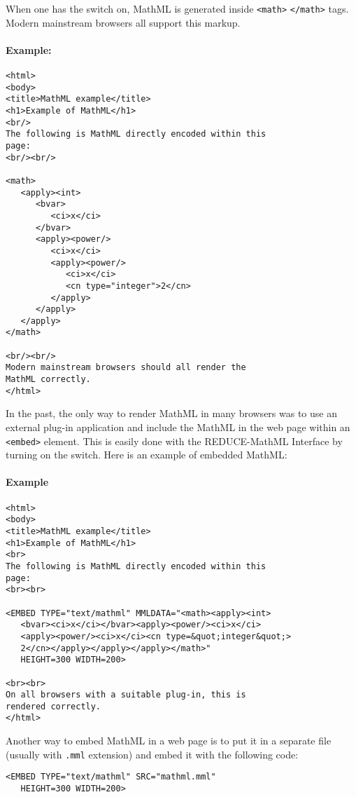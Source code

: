 When one has the  switch on, MathML is generated inside
\verb|<math>| \verb|</math>| tags.  Modern mainstream browsers all
support this markup.

\paragraph{Example:}
\begin{verbatim}
<html>
<body>
<title>MathML example</title>
<h1>Example of MathML</h1>
<br/>
The following is MathML directly encoded within this
page:
<br/><br/>

<math>
   <apply><int>
      <bvar>
         <ci>x</ci>
      </bvar>
      <apply><power/>
         <ci>x</ci>
         <apply><power/>
            <ci>x</ci>
            <cn type="integer">2</cn>
         </apply>
      </apply>
   </apply>
</math>

<br/><br/>
Modern mainstream browsers should all render the
MathML correctly.
</html>
\end{verbatim} 

In the past, the only way to render MathML in many browsers was to use
an external plug-in application and include the MathML in the web page
within an \verb|<embed>| element.  This is easily done with the
REDUCE-MathML Interface by turning on the  switch.  Here is an
example of embedded MathML:

\paragraph{Example}

\begin{verbatim}
<html>
<body>
<title>MathML example</title>
<h1>Example of MathML</h1>
<br>
The following is MathML directly encoded within this
page:
<br><br>

<EMBED TYPE="text/mathml" MMLDATA="<math><apply><int>
   <bvar><ci>x</ci></bvar><apply><power/><ci>x</ci>
   <apply><power/><ci>x</ci><cn type=&quot;integer&quot;>
   2</cn></apply></apply></apply></math>"
   HEIGHT=300 WIDTH=200>

<br><br>
On all browsers with a suitable plug-in, this is
rendered correctly.
</html>
\end{verbatim} 

Another way to embed MathML in a web page is to put it in a separate
file (usually with \texttt{.mml} extension) and embed it with the
following code:
\begin{verbatim}
<EMBED TYPE="text/mathml" SRC="mathml.mml"
   HEIGHT=300 WIDTH=200>
\end{verbatim}

